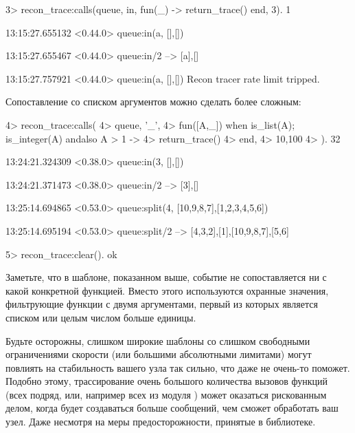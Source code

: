 \begin{VerbatimEshell}
3> recon_trace:calls({queue, in, fun(_) -> return_trace() end}, 3).
1

13:15:27.655132 <0.44.0> queue:in(a, {[],[]})

13:15:27.655467 <0.44.0> queue:in/2 --> {[a],[]}

13:15:27.757921 <0.44.0> queue:in(a, {[],[]})
Recon tracer rate limit tripped.
\end{VerbatimEshell}

Сопоставление со списком аргументов можно сделать более сложным:

\begin{VerbatimEshell}
4> recon_trace:calls(
4>   {queue, '_',
4>    fun([A,_]) when is_list(A); is_integer(A) andalso A > 1 ->
4>        return_trace()
4>    end},
4>   {10,100}
4> ).
32

13:24:21.324309 <0.38.0> queue:in(3, {[],[]})

13:24:21.371473 <0.38.0> queue:in/2 --> {[3],[]}

13:25:14.694865 <0.53.0> queue:split(4, {[10,9,8,7],[1,2,3,4,5,6]})

13:25:14.695194 <0.53.0> queue:split/2 --> {{[4,3,2],[1]},{[10,9,8,7],[5,6]}}

5> recon_trace:clear().
ok
\end{VerbatimEshell}

Заметьте, что в шаблоне, показанном выше, событие не сопоставляется ни с какой конкретной функцией. Вместо этого используются охранные значения, фильтрующие функции с двумя аргументами, первый из которых является списком или целым числом больше единицы.

Будьте осторожны, слишком широкие шаблоны со слишком свободными ограничениями скорости (или большими абсолютными лимитами) могут повлиять на стабильность вашего узла так сильно, что даже  не очень-то поможет. Подобно этому, трассирование очень большого количества вызовов функций (всех подряд, или, например всех из модуля ) может оказаться рискованным делом, когда будет создаваться больше сообщений, чем сможет обработать ваш узел. Даже несмотря на меры предосторожности, принятые в библиотеке.

